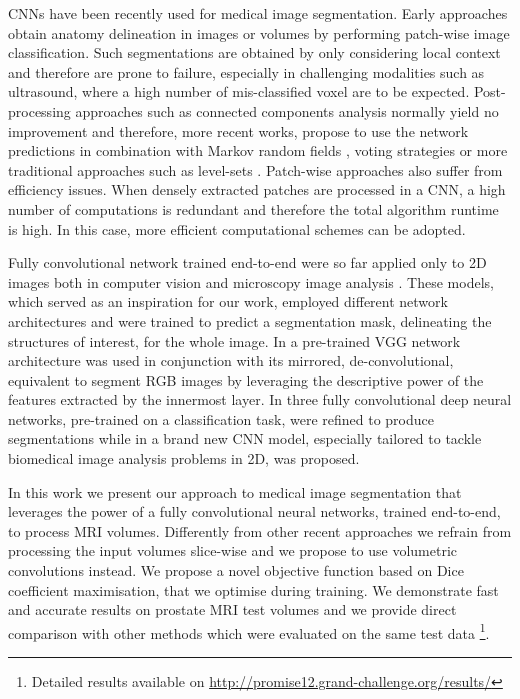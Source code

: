 CNNs have been recently used for medical image segmentation. 
Early approaches obtain anatomy delineation in images or volumes by performing patch-wise image classification. Such segmentations are obtained by only considering local context and therefore are prone to failure, especially in challenging modalities such as ultrasound, where a high number of mis-classified voxel are to be expected.
Post-processing approaches such as connected components analysis normally yield no improvement and therefore, more recent works, propose to use the network predictions in combination with Markov random fields  \cite{kamnitsas2016efficient}, voting strategies \cite{milletari2016hough} or more traditional approaches such as level-sets  \cite{cha2016urinary}. 
Patch-wise approaches also suffer from efficiency issues. When densely extracted patches are processed in a CNN, a high number of computations is redundant and therefore the total algorithm runtime is high. In this case, more efficient computational schemes can be adopted.

Fully convolutional network trained end-to-end were so far applied only to 2D images both in computer vision \cite{noh2015learning,long2015fully} and microscopy image analysis \cite{ronneberger2015u}. These models, which served as an inspiration for our work, employed different network architectures and were trained to predict a segmentation mask, delineating the structures of interest, for the whole image. In \cite{noh2015learning} a pre-trained VGG network architecture \cite{simonyan2014very} was used in conjunction with its mirrored, de-convolutional, equivalent to segment RGB images by leveraging the descriptive power of the features extracted by the innermost layer. In \cite{long2015fully} three fully convolutional deep neural networks, pre-trained on a classification task, were refined to produce segmentations while in \cite{ronneberger2015u} a brand new CNN model, especially tailored to tackle biomedical image analysis problems in 2D, was proposed.

In this work we present our approach to medical image segmentation that leverages the power of a fully convolutional neural networks, trained end-to-end, to process MRI volumes. 
Differently from other recent approaches we refrain from processing the input volumes slice-wise and we propose to use volumetric convolutions instead. We propose a novel objective function based on Dice coefficient maximisation, that we optimise during training.
We demonstrate fast and accurate results on prostate MRI test volumes and we provide direct comparison with other methods which were evaluated on the same test data \footnote{Detailed results available on \url{http://promise12.grand-challenge.org/results/}}. 
